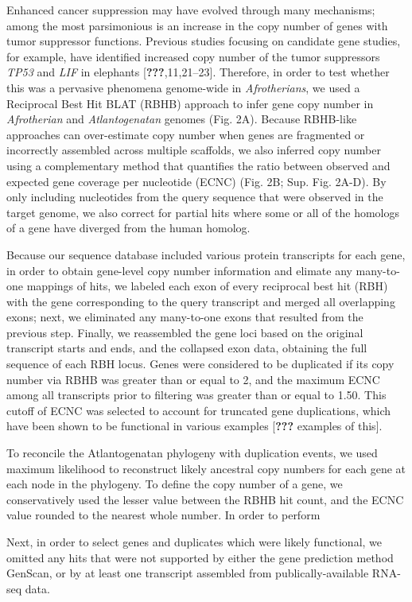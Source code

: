 \documentclass[10pt,letterpaper]{article}
\begin{document}
Enhanced cancer suppression may have evolved through many mechanisms;
among the most parsimonious is an increase in the copy number of genes
with tumor suppressor functions. Previous studies focusing on candidate
gene studies, for example, have identified increased copy number of the
tumor suppressors \emph{TP53} and \emph{LIF} in elephants
{[}{\textbf{???}},11,21--23{]}. Therefore, in order to test whether this
was a pervasive phenomena genome-wide in \emph{Afrotherians}, we used a
Reciprocal Best Hit BLAT (RBHB) approach to infer gene copy number in
\emph{Afrotherian} and \emph{Atlantogenatan} genomes (Fig. 2A). Because
RBHB-like approaches can over-estimate copy number when genes are
fragmented or incorrectly assembled across multiple scaffolds, we also
inferred copy number using a complementary method that quantifies the
ratio between observed and expected gene coverage per nucleotide (ECNC)
(Fig. 2B; Sup. Fig. 2A-D). By only including nucleotides from the query
sequence that were observed in the target genome, we also correct for
partial hits where some or all of the homologs of a gene have diverged
from the human homolog.

Because our sequence database included various protein transcripts for
each gene, in order to obtain gene-level copy number information and
elimate any many-to-one mappings of hits, we labeled each exon of every
reciprocal best hit (RBH) with the gene corresponding to the query
transcript and merged all overlapping exons; next, we eliminated any
many-to-one exons that resulted from the previous step. Finally, we
reassembled the gene loci based on the original transcript starts and
ends, and the collapsed exon data, obtaining the full sequence of each
RBH locus. Genes were considered to be duplicated if its copy number via
RBHB was greater than or equal to 2, and the maximum ECNC among all
transcripts prior to filtering was greater than or equal to 1.50. This
cutoff of ECNC was selected to account for truncated gene duplications,
which have been shown to be functional in various examples
{[}{\textbf{???}} examples of this{]}.

To reconcile the Atlantogenatan phylogeny with duplication events, we
used maximum likelihood to reconstruct likely ancestral copy numbers for
each gene at each node in the phylogeny. To define the copy number of a
gene, we conservatively used the lesser value between the RBHB hit
count, and the ECNC value rounded to the nearest whole number. In order
to perform

Next, in order to select genes and duplicates which were likely
functional, we omitted any hits that were not supported by either the
gene prediction method GenScan, or by at least one transcript assembled
from publically-available RNA-seq data.
\end{document}
